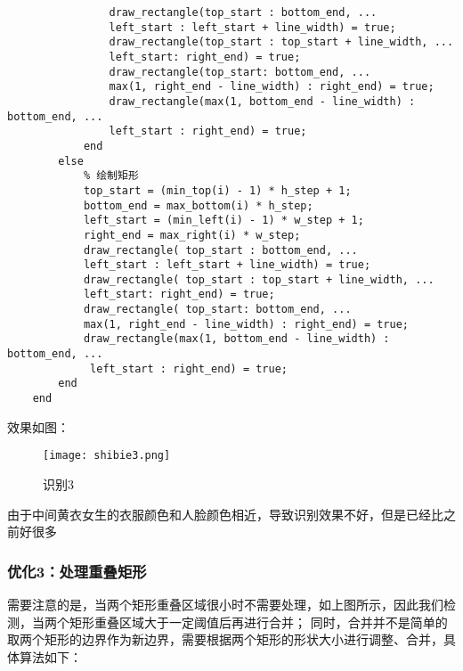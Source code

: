 \documentclass[12pt]{article}
\begin{document}
\begin{lstlisting}
                draw_rectangle(top_start : bottom_end, ...
                left_start : left_start + line_width) = true;
                draw_rectangle(top_start : top_start + line_width, ...
                left_start: right_end) = true;
                draw_rectangle(top_start: bottom_end, ...
                max(1, right_end - line_width) : right_end) = true;
                draw_rectangle(max(1, bottom_end - line_width) : bottom_end, ... 
                left_start : right_end) = true;
            end
        else
            % 绘制矩形
            top_start = (min_top(i) - 1) * h_step + 1;
            bottom_end = max_bottom(i) * h_step;
            left_start = (min_left(i) - 1) * w_step + 1;
            right_end = max_right(i) * w_step;
            draw_rectangle( top_start : bottom_end, ...  
            left_start : left_start + line_width) = true;
            draw_rectangle( top_start : top_start + line_width, ... 
            left_start: right_end) = true;
            draw_rectangle( top_start: bottom_end, ... 
            max(1, right_end - line_width) : right_end) = true;
            draw_rectangle(max(1, bottom_end - line_width) : bottom_end, ... 
             left_start : right_end) = true;
        end
    end
\end{lstlisting}

效果如图：
\begin{figure}[H]
    \centering
    \texttt{[image: shibie3.png]}
    \caption{识别3}
\end{figure}
由于中间黄衣女生的衣服颜色和人脸颜色相近，导致识别效果不好，但是已经比之前好很多

\subsubsection{优化3：处理重叠矩形}
需要注意的是，当两个矩形重叠区域很小时不需要处理，如上图所示，因此我们检测，当两个矩形重叠区域大于一定阈值后再进行合并；
同时，合并并不是简单的取两个矩形的边界作为新边界，需要根据两个矩形的形状大小进行调整、合并，具体算法如下：
\end{document}
